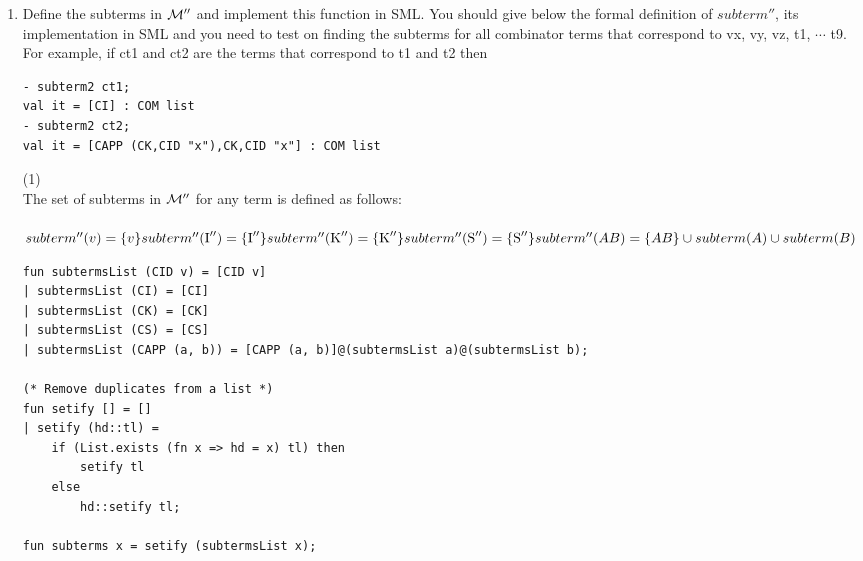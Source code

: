 \documentclass[11pt]{article}
\begin{document}
\begin{enumerate}
\pagebreak	
\item
  Define the subterms in ${\cal M}''$ and implement this function in SML.
  You should give below the formal definition of $subterm''$, its implementation   in SML and you need to test on finding the subterms for all combinator terms that correspond to  vx, vy, vz, t1, $\cdots$ t9.  For example, if ct1 and ct2  are the terms that correspond to t1 and t2 then
\begin{verbatim}
- subterm2 ct1;
val it = [CI] : COM list
- subterm2 ct2;
val it = [CAPP (CK,CID "x"),CK,CID "x"] : COM list
\end{verbatim}
 \hfill{(1)}\\ %
The set of subterms in ${\cal M}''$ for any term is defined as follows:\\ \\
$subterm''(v) = \{v\}\\
subterm''(\mbox{I}'') = \{\mbox{I}''\}\\
subterm''(\mbox{K}'') = \{\mbox{K}''\}\\
subterm''(\mbox{S}'') = \{\mbox{S}''\}\\
subterm''(AB) = \{AB\} \cup subterm(A) \cup subterm(B) $
\begin{verbatim}
fun subtermsList (CID v) = [CID v]
| subtermsList (CI) = [CI]
| subtermsList (CK) = [CK]
| subtermsList (CS) = [CS]
| subtermsList (CAPP (a, b)) = [CAPP (a, b)]@(subtermsList a)@(subtermsList b);

(* Remove duplicates from a list *)
fun setify [] = []
| setify (hd::tl) = 
	if (List.exists (fn x => hd = x) tl) then
		setify tl
	else
		hd::setify tl;

fun subterms x = setify (subtermsList x);

\end{verbatim}


\end{enumerate}
\end{document}
